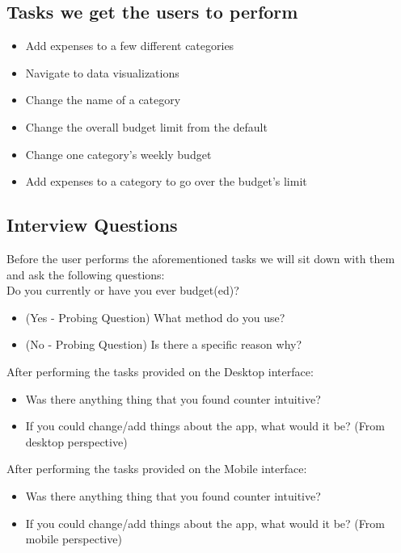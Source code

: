 \documentclass{chi2011}
\begin{document}
	\subsection{Tasks we get the users to perform}
	\begin{itemize}
        \item  Add expenses to a few different categories
        \item  Navigate to data visualizations
        \item  Change the name of a category
        \item  Change the overall budget limit from the default
        \item  Change one category's weekly budget
        \item  Add expenses to a category to go over the budget's limit
	\end{itemize}

	\subsection{Interview Questions}
	Before the user performs the aforementioned tasks we will sit down with them and ask the following 
	questions:\\
    Do you currently or have you ever budget(ed)?
			\begin{itemize}
				\item (Yes - Probing Question) What method do you use?
				\item (No - Probing Question) Is there a specific reason why?
			\end{itemize}

    After performing the tasks provided on the Desktop interface:
	\begin{itemize}
		\item Was there anything thing that you found counter intuitive?
		\item If you could change/add things about the app, what would it be? (From desktop perspective)
	\end{itemize}

    After performing the tasks provided on the Mobile interface:
	\begin{itemize}
		\item Was there anything thing that you found counter intuitive?
		\item If you could change/add things about the app, what would it be? (From mobile perspective)
	\end{itemize}
\end{document}
